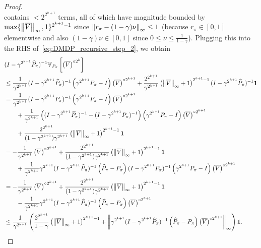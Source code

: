 \documentclass{article}
\theoremstyle{plain}
\theoremstyle{plain}
\theoremstyle{remark}
\theoremstyle{plain}
\theoremstyle{plain}
\newcommand{\Var}{\mathbb{V}}
\newcommand{\Phat}{\widehat{P}}
\newcommand{\one}{\mathbf{1}}
\newcommand{\Vc}{\overline{V}}
\begin{document}
\begin{proof}
\[\]
contains $< 2^{2^{k+1}}$ terms, all of which have magnitude bounded by $\max\{\infnorm{\Vc}, 1\}^{2^{k+1}-1}$ since $\left\Vert r_\pi - (1-\gamma) \nu\right\Vert _{\infty} \leq 1$ (because $r_\pi \in [0,1]$ elementwise and also $(1-\gamma) \nu \in [0,1]$ since $0 \leq \nu \leq \frac{1}{1-\gamma}$).
Plugging this into the RHS of~\eqref{eq:DMDP_recursive_step_2}, we obtain
\begin{align*}
    &(I - \gamma^{2^{k+1}} \Phat_{\pi})^{-1}\Var_{P_{\pi}} \left[ \left(\Vc \right)^{\circ 2^k}  \right] \\
    & \leq  \frac{1}{\gamma^{2^{k+1}}} (I - \gamma^{2^{k+1}} \Phat_{\pi})^{-1} \left(\gamma^{2^{k+1}} P_{\pi} - I\right) \left(\Vc \right)^{\circ 2^{k+1}}  + \frac{2^{2^{k+1}}}{\gamma^{2^{k+1}}} \left(\infnorm{\Vc} + 1 \right)^{2^{k+1}-1} (I - \gamma^{2^{k+1}} \Phat_{\pi})^{-1} \one \\
    &= \frac{1}{\gamma^{2^{k+1}}} (I - \gamma^{2^{k+1}} P_{\pi})^{-1} \left(\gamma^{2^{k+1}} P_{\pi} - I\right) \left(\Vc \right)^{\circ 2^{k+1}} \\
    & \quad \quad + \frac{1}{\gamma^{2^{k+1}}} \left((I - \gamma^{2^{k+1}} \Phat_{\pi})^{-1} - (I - \gamma^{2^{k+1}} P_{\pi})^{-1} \right)\left(\gamma^{2^{k+1}} P_{\pi} - I\right) \left(\Vc \right)^{\circ 2^{k+1}} \\
    & \quad \quad + \frac{2^{2^{k+1}}}{(1-\gamma^{2^{k+1}})\gamma^{2^{k+1}}} \left(\infnorm{\Vc} + 1 \right)^{2^{k+1}-1}  \one \\
    & = -\frac{1}{\gamma^{2^{k+1}}} \left(\Vc \right)^{\circ 2^{k+1}} + \frac{2^{2^{k+1}}}{(1-\gamma^{2^{k+1}})\gamma^{2^{k+1}}} \left(\infnorm{\Vc} + 1 \right)^{2^{k+1}-1}  \one \\
    & \quad \quad + \frac{1}{\gamma^{2^{k+1}}} \gamma^{2^{k+1}}(I - \gamma^{2^{k+1}} \Phat_{\pi})^{-1}\left(\Phat_\pi - P_\pi \right) (I - \gamma^{2^{k+1}} P_{\pi})^{-1} \left(\gamma^{2^{k+1}} P_{\pi} - I\right) \left(\Vc \right)^{\circ 2^{k+1}} \\
    & = -\frac{1}{\gamma^{2^{k+1}}} \left(\Vc \right)^{\circ 2^{k+1}} + \frac{2^{2^{k+1}}}{(1-\gamma^{2^{k+1}})\gamma^{2^{k+1}}} \left(\infnorm{\Vc} + 1 \right)^{2^{k+1}-1}  \one \\
    & \quad \quad - \frac{1}{\gamma^{2^{k+1}}} \gamma^{2^{k+1}}(I - \gamma^{2^{k+1}} \Phat_{\pi})^{-1}\left(\Phat_\pi - P_\pi \right)  \left(\Vc \right)^{\circ 2^{k+1}} \\
    & \leq \frac{1}{\gamma^{2^{k+1}}} \left(\frac{2^{2^{k+1}}}{1-\gamma} \left(\infnorm{\Vc} + 1 \right)^{2^{k+1}-1} + \infnorm{\gamma^{2^{k+1}}(I - \gamma^{2^{k+1}} \Phat_{\pi})^{-1}\left(\Phat_\pi - P_\pi \right) \left(\Vc \right)^{\circ 2^{k+1}}} \right) \one.

\end{align*}
\end{proof}
\end{document}
